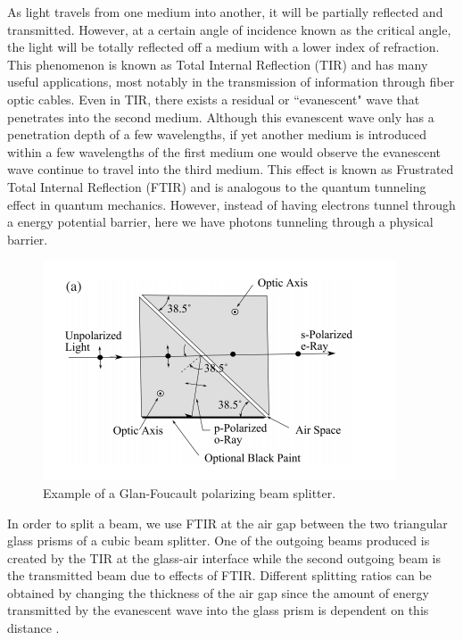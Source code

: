 \documentclass[pdftex,12pt,a4paper]{article}
\begin{document}
As light travels from one medium into another, it will be partially reflected and transmitted. However, at a certain angle of incidence known as the critical angle, the light will be totally reflected off a medium with a lower index of refraction. This phenomenon is known as Total Internal Reflection (TIR) and has many useful applications, most notably in the transmission of information through fiber optic cables. Even in TIR, there exists a residual or ``evanescent" wave that penetrates into the second medium. Although this evanescent wave only has a penetration depth of a few wavelengths, if yet another medium is introduced within a few wavelengths of the first medium one would observe the evanescent wave continue to travel into the third medium. This effect is known as Frustrated Total Internal Reflection (FTIR) and is analogous to the quantum tunneling effect in quantum mechanics. However, instead of having electrons tunnel through a energy potential barrier, here we have photons tunneling through a physical barrier\cite{FTIR}. 

\begin{figure}[h]
  \centering
    \includegraphics[scale=1]{GlanFoucaultPrism}
  \caption{Example of a Glan-Foucault polarizing beam splitter\cite{Properties_of_Prisms}.}
  \label{fig:GFPrism}
\end{figure}

In order to split a beam, we use FTIR at the air gap between the two triangular glass prisms of a cubic beam splitter. One of the outgoing beams produced is created by the TIR at the glass-air interface while the second outgoing beam is the transmitted beam due to effects of FTIR. Different splitting ratios can be obtained by changing the thickness of the air gap since the amount of energy transmitted by the evanescent wave into the glass prism is dependent on this distance \cite{Properties_of_Prisms}. 
\end{document}
